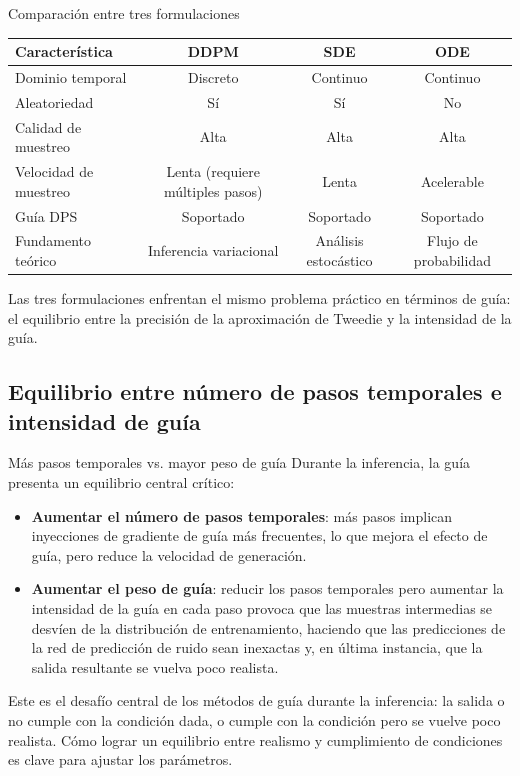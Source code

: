 \begin{knowledgebox}{Comparación entre tres formulaciones}
\begin{center}
\begin{tabular}{lccc}
\toprule
Característica & DDPM & SDE & ODE \\
\midrule
Dominio temporal & Discreto & Continuo & Continuo \\
Aleatoriedad & Sí & Sí & No \\
Calidad de muestreo & Alta & Alta & Alta \\
Velocidad de muestreo & Lenta (requiere múltiples pasos) & Lenta & Acelerable \\
Guía DPS & Soportado & Soportado & Soportado \\
Fundamento teórico & Inferencia variacional & Análisis estocástico & Flujo de probabilidad \\
\bottomrule
\end{tabular}
\end{center}
Las tres formulaciones enfrentan el mismo problema práctico en términos de guía: el equilibrio entre la precisión de la aproximación de Tweedie y la intensidad de la guía.
\end{knowledgebox}

\subsection{Equilibrio entre número de pasos temporales e intensidad de guía}

\begin{warningbox}{Más pasos temporales vs. mayor peso de guía}
Durante la inferencia, la guía presenta un equilibrio central crítico:
\begin{itemize}
    \item \textbf{Aumentar el número de pasos temporales}: más pasos implican inyecciones de gradiente de guía más frecuentes, lo que mejora el efecto de guía, pero reduce la velocidad de generación.
    \item \textbf{Aumentar el peso de guía}: reducir los pasos temporales pero aumentar la intensidad de la guía en cada paso provoca que las muestras intermedias se desvíen de la distribución de entrenamiento, haciendo que las predicciones de la red de predicción de ruido sean inexactas y, en última instancia, que la salida resultante se vuelva poco realista.
\end{itemize}
Este es el desafío central de los métodos de guía durante la inferencia: la salida o no cumple con la condición dada, o cumple con la condición pero se vuelve poco realista. Cómo lograr un equilibrio entre realismo y cumplimiento de condiciones es clave para ajustar los parámetros.
\end{warningbox}

